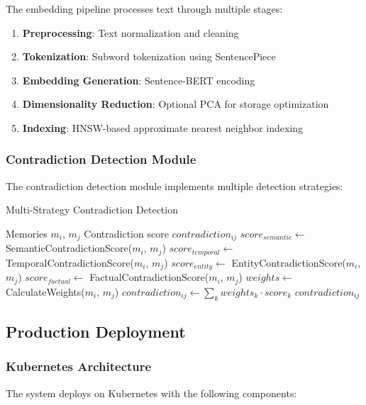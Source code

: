\documentclass[12pt,a4paper]{article}
\begin{document}
The embedding pipeline processes text through multiple stages:

\begin{enumerate}
\item \textbf{Preprocessing}: Text normalization and cleaning
\item \textbf{Tokenization}: Subword tokenization using SentencePiece
\item \textbf{Embedding Generation}: Sentence-BERT encoding
\item \textbf{Dimensionality Reduction}: Optional PCA for storage optimization
\item \textbf{Indexing}: HNSW-based approximate nearest neighbor indexing
\end{enumerate}

\subsubsection{Contradiction Detection Module}

The contradiction detection module implements multiple detection strategies:

\begin{algorithm}
\caption{Multi-Strategy Contradiction Detection}
\begin{algorithmic}[1]
\REQUIRE Memories $m_i$, $m_j$
\ENSURE Contradiction score $contradiction_{ij}$
\STATE $score_{semantic} \leftarrow$ SemanticContradictionScore($m_i$, $m_j$)
\STATE $score_{temporal} \leftarrow$ TemporalContradictionScore($m_i$, $m_j$)
\STATE $score_{entity} \leftarrow$ EntityContradictionScore($m_i$, $m_j$)
\STATE $score_{factual} \leftarrow$ FactualContradictionScore($m_i$, $m_j$)
\STATE $weights \leftarrow$ CalculateWeights($m_i$, $m_j$)
\STATE $contradiction_{ij} \leftarrow \sum_k weights_k \cdot score_k$
\RETURN $contradiction_{ij}$
\end{algorithmic}
\end{algorithm}

\subsection{Production Deployment}

\subsubsection{Kubernetes Architecture}

The system deploys on Kubernetes with the following components:
\end{document}
